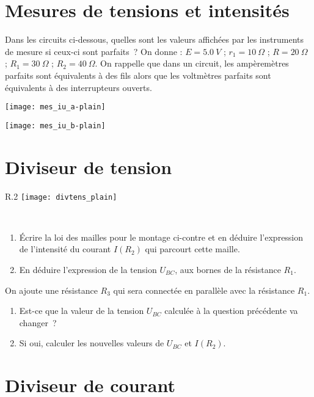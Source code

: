 \documentclass[a4paper, 12pt, final, garamond]{book}
\begin{document}
\section{Mesures de tensions et intensités}

Dans les circuits ci-dessous, quelles sont les valeurs affichées par les
instruments de mesure si ceux-ci sont parfaits~? On donne : $E = \SI{5,0}{V}$ ;
$r_1 = \SI{10}{\Omega}$ ; $R = \SI{20}{\Omega}$ ; $R_1 = \SI{30}{\Omega}$ ; $R_2
= \SI{40}{\Omega}$. On rappelle que dans un circuit, les ampèremètres parfaits
sont équivalents à des fils alors que les voltmètres parfaits sont équivalents à
des interrupteurs ouverts.

\begin{minipage}{0.48\linewidth}
    \texttt{[image: mes\_iu\_a-plain]}
\end{minipage}
\hfill
\begin{minipage}{0.48\linewidth}
    \texttt{[image: mes\_iu\_b-plain]}
\end{minipage}

\section{Diviseur de tension}

\begin{wrapfigure}[10]{R}{.2\linewidth}
    \centering
    \texttt{[image: divtens\_plain]}
\end{wrapfigure}
~
\begin{enumerate}
    \item Écrire la loi des mailles pour le montage ci-contre et en déduire
        l'expression de l'intensité du courant $I(R_2)$ qui parcourt cette
        maille.
    \item En déduire l'expression de la tension $U_{BC}$, aux bornes de la
        résistance $R_1$.
\end{enumerate}
On ajoute une résistance $R_3$ qui sera connectée en parallèle avec la
résistance $R_1$.
\begin{enumerate}[resume]
    \item Est-ce que la valeur de la tension $U_{BC}$ calculée à la question
        précédente va changer~?
    \item Si oui, calculer les nouvelles valeurs de $U_{BC}$ et $I(R_2)$.
\end{enumerate}

\section{Diviseur de courant}
\end{document}
